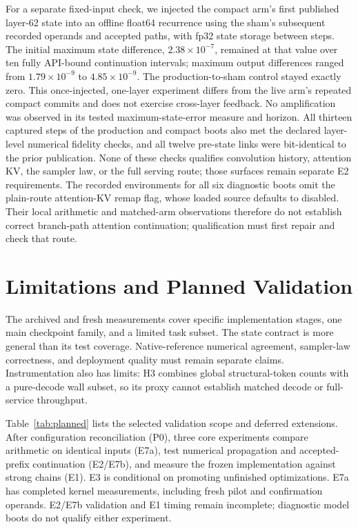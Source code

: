 \documentclass[conference]{IEEEtran}
\begin{document}
For a separate fixed-input check, we injected the compact arm's first published layer-62 state into an offline float64 recurrence using the sham's subsequent recorded operands and accepted paths, with fp32 state storage between steps. The initial maximum state difference, $2.38\times10^{-7}$, remained at that value over ten fully API-bound continuation intervals; maximum output differences ranged from $1.79\times10^{-9}$ to $4.85\times10^{-9}$. The production-to-sham control stayed exactly zero. This once-injected, one-layer experiment differs from the live arm's repeated compact commits and does not exercise cross-layer feedback. No amplification was observed in its tested maximum-state-error measure and horizon. All thirteen captured steps of the production and compact boots also met the declared layer-level numerical fidelity checks, and all twelve pre-state links were bit-identical to the prior publication. None of these checks qualifies convolution history, attention KV, the sampler law, or the full serving route; those surfaces remain separate E2 requirements. The recorded environments for all six diagnostic boots omit the plain-route attention-KV remap flag, whose loaded source defaults to disabled. Their local arithmetic and matched-arm observations therefore do not establish correct branch-path attention continuation; qualification must first repair and check that route.

\section{Limitations and Planned Validation}
\label{sec:planned}
The archived and fresh measurements cover specific implementation stages, one main checkpoint family, and a limited task subset. The state contract is more general than its test coverage. Native-reference numerical agreement, sampler-law correctness, and deployment quality must remain separate claims. Instrumentation also has limits: H3 combines global structural-token counts with a pure-decode wall subset, so its proxy cannot establish matched decode or full-service throughput.

Table~\ref{tab:planned} lists the selected validation scope and deferred extensions. After configuration reconciliation (P0), three core experiments compare arithmetic on identical inputs (E7a), test numerical propagation and accepted-prefix continuation (E2/E7b), and measure the frozen implementation against strong chains (E1). E3 is conditional on promoting unfinished optimizations. E7a has completed kernel measurements, including fresh pilot and confirmation operands. E2/E7b validation and E1 timing remain incomplete; diagnostic model boots do not qualify either experiment.
\end{document}
